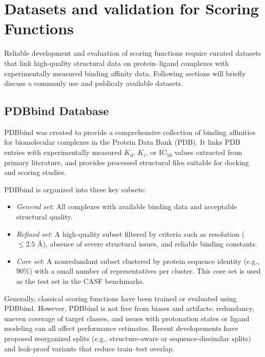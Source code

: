 \documentclass[12pt]{article}
\begin{document}
\section{Datasets and validation for Scoring Functions}

Reliable development and evaluation of scoring functions require curated datasets that link high-quality  structural data on protein--ligand complexes with experimentally measured binding affinity data. Following sections will briefly discuss a commonly use and publicaly available datasets. 

\subsection{PDBbind Database}

PDBbind was created to provide a comprehensive collection of binding affinities for biomolecular complexes in the Protein Data Bank (PDB).\cite{CH3_Wang2004_PDBbind,CH3_Wang2005_PDBbind,CH3_Liu2015_PDBbind} It links PDB entries with experimentally measured $K_d$, $K_i$, or IC$_{50}$ values extracted from primary literature, and provides processed structural files suitable for docking and scoring studies.

PDBbind is organized into three key subsets:
\begin{itemize}
    \item \textit{General set}: All complexes with available binding data and acceptable structural quality.
    \item \textit{Refined set}: A high-quality subset filtered by criteria such as resolution ($\leq 2.5$ \r{A}), absence of severe structural issues, and reliable binding constants.
    \item \textit{Core set}: A nonredundant subset clustered by protein sequence identity (e.g., 90\%) with a small number of representatives per cluster. This core set is used as the test set in the CASF benchmarks.
\end{itemize}

Generally, classical scoring functions have been trained or evaluated using PDBbind.\cite{CH3_Trott2010_Vina,CH3_Wang2017} However, PDBbind is not free from biases and artifacts: redundancy, uneven coverage of target classes, and issues with protonation states or ligand modeling can all affect performance estimates. Recent developements have proposed reorganized splits (e.g., structure-aware or sequence-dissimilar splits) and leak-proof variants that reduce train--test overlap.\cite{CH3_li2017structural,CH3_li2021machine}
\end{document}
